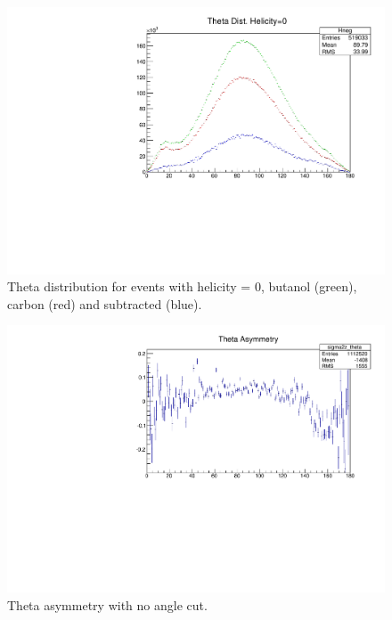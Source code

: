 \documentclass[a4paper,12pt]{article}
\begin{document}
\begin{figure}
\includegraphics[width=\textwidth]{Asym/Theta_h0_b4.pdf}
\caption{Theta distribution for events with helicity = 0, butanol (green), carbon (red) and subtracted (blue). }
\end{figure}

\begin{figure}
\includegraphics[width=\textwidth]{Asym/theta_asym.pdf}
\caption{Theta asymmetry with no angle cut. }
\end{figure}
\end{document}
